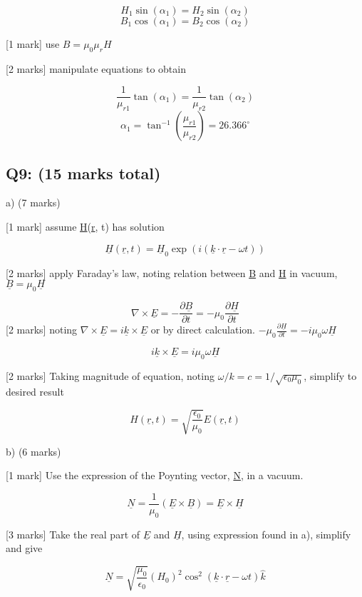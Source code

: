 \documentclass[a4paper,11pt]{article}
\begin{document}
\[ H_1 \sin(\alpha_1) = H_2 \sin(\alpha_2) \]
\[ B_1 \cos(\alpha_1) = B_2 \cos(\alpha_2) \]

[1 mark] use \( B = \mu_0 \mu_r H \)

[2 marks] manipulate equations to obtain 

\[ \frac{1}{\mu_{r1}} \tan(\alpha_1) = \frac{1}{\mu_{r2}} \tan(\alpha_2) \]
\[ \alpha_1 = \tan^{-1}\left ( \frac{\mu_{r1}}{\mu_{r2}} \right ) = 26.366^{\circ} \]

\subsection*{Q9: (15 marks total)}

a) (7 marks)

[1 mark] assume \underline{H}(\underline{r}, t) has solution

\[ \underline{H}(\underline{r}, t) = \underline{H}_0 \exp (i(\underline{k} \cdot \underline{r} - \omega t)) \]

[2 marks] apply Faraday's law, noting relation between \underline{B} and \underline{H} in vacuum, \( \underline{B} = \mu_0 \underline{H} \)

\[ \nabla \times \underline{E} = - \frac{\partial \underline{B}}{\partial t} = - \mu_0 \frac{\partial \underline{H}}{\partial t}  \]
[2 marks] noting \( \nabla \times \underline{E} = i \underline{k} \times \underline{E} \) or by direct calculation. \( - \mu_0 \frac{\partial \underline{H}}{\partial t} = - i \mu_0 \omega \underline{H} \)

\[ i \underline{k} \times \underline{E} = i \mu_0 \omega \underline{H} \]

[2 marks] Taking magnitude of equation, noting \( \omega / k = c = 1 / \sqrt{\epsilon_0 \mu_0} \), simplify to desired result 

\[ H(\underline{r}, t) = \sqrt{\frac{\epsilon_{0}}{\mu_{0}}} E(\underline{r}, t) \]

b) (6 marks)

[1 mark] Use the expression of the Poynting vector, \underline{N}, in a vacuum. 

\[ \underline{N} = \frac{1}{\mu_0} ( \underline{E} \times \underline{B} ) = \underline{E} \times \underline{H} \]

[3 marks] Take the real part of \( \underline{E} \) and \( \underline{H} \), using expression found in a), simplify and give 

\[ \underline{N} = \sqrt{\frac{\mu_0}{\epsilon_0}} (H_0)^2 \cos^2(\underline{k} \cdot \underline{r} - \omega t) \hat{k} \]
\end{document}
